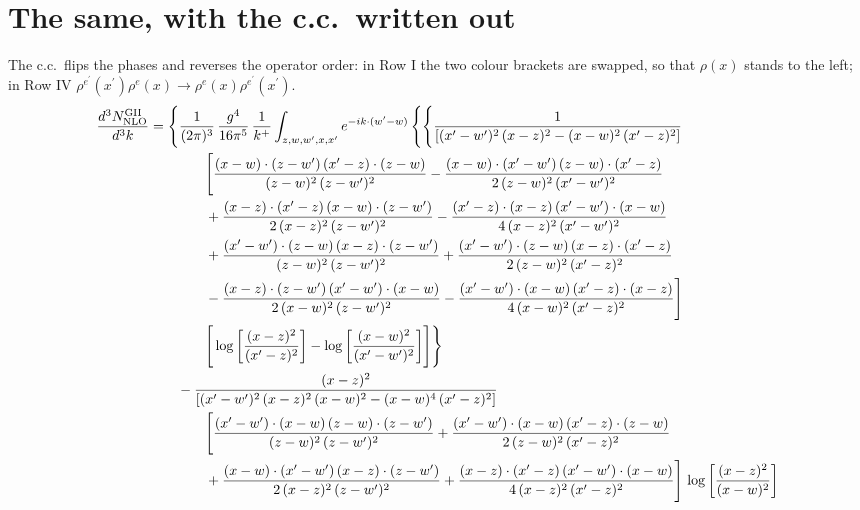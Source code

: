 \documentclass[10pt]{article}
\begin{document}
\section{The same, with the c.c.\ written out}
The c.c.\ flips the phases and reverses the operator order: in Row I the two colour brackets are swapped, so that $\rho(x)$ stands to the left; in Row IV $\rho^{e^{\prime}}(x^{\prime})\rho^{e}(x)\to\rho^{e}(x)\rho^{e^{\prime}}(x^{\prime})$.
\begin{align}
\frac{d^{3}N^{\rm GII}_{\rm NLO}}{d^{3}k}&=\Bigg\{\frac{1}{(2\pi)^{3}}\,\frac{g^{4}}{16\pi^{5}}\,\frac{1}{k^{+}}\int_{z,w,w^{\prime},x,x^{\prime}}e^{-ik\cdot(w^{\prime}-w)}\,\Bigg\{\Bigg\{ \frac{1}{\left[(x^{\prime}-w^{\prime})^{2}\, (x-z)^{2}-(x-w)^{2}\, (x^{\prime}-z)^{2}\right]}\,\notag\\&\qquad\qquad  \Bigg[\frac{(x-w)\cdot (z-w^{\prime})\, (x^{\prime}-z)\cdot (z-w)}{(z-w)^{2}\,(z-w^{\prime})^{2}}-\frac{(x-w)\cdot (x^{\prime}-w^{\prime})\, (z-w)\cdot (x^{\prime}-z)}{2\, (z-w)^{2}\, (x^{\prime}-w^{\prime})^{2}}\notag\\&\qquad\qquad  + \frac{(x-z)\cdot (x^{\prime}-z)\, (x-w)\cdot (z-w^{\prime})}{2\, (x-z)^{2}\, (z-w^{\prime})^{2}}-\frac{(x^{\prime}-z)\cdot (x-z)\, (x^{\prime}-w^{\prime})\cdot (x-w)}{4\, (x-z)^{2}\, (x^{\prime}-w^{\prime})^{2}}\notag\\&\qquad\qquad  + \frac{(x^{\prime}-w^{\prime})\cdot (z-w)\, (x-z)\cdot (z-w^{\prime})}{(z-w)^{2}\,(z-w^{\prime})^{2}}+\frac{(x^{\prime}-w^{\prime})\cdot (z-w)\, (x-z)\cdot (x^{\prime}-z)}{2\, (z-w)^{2}\, (x^{\prime}-z)^{2}}\notag\\&\qquad\qquad  - \frac{(x-z)\cdot (z-w^{\prime})\, (x^{\prime}-w^{\prime})\cdot (x-w)}{2\, (x-w)^{2}\, (z-w^{\prime})^{2}} -\frac{(x^{\prime}-w^{\prime})\cdot (x-w)\, (x^{\prime}-z)\cdot (x-z)}{4\, (x-w)^{2}\, (x^{\prime}-z)^{2}}\Bigg]\notag\\&\qquad\qquad   \Bigg[\log{\left[\frac{(x-z)^{2}}{ (x^{\prime}-z)^{2}}\right]}-\log{\left[\frac{(x-w)^{2}}{(x^{\prime}-w^{\prime})^{2}}\right]}\Bigg]\Bigg\}\notag\\
&\qquad-\frac{(x-z)^{2}}{\left[(x^{\prime}-w^{\prime})^{2}\,(x-z)^{2}\,(x-w)^{2} - (x-w)^{4}\, (x^{\prime}-z)^{2}\right]}\,  \notag\\&\qquad\qquad  \Bigg[\frac{(x^{\prime}-w^{\prime})\cdot (x-w)\, (z-w)\cdot (z-w^{\prime})}{(z-w)^{2}\, (z-w^{\prime})^{2}}+\frac{(x^{\prime}-w^{\prime})\cdot (x-w)\, (x^{\prime}-z)\cdot (z-w)}{2\, (z-w)^{2}\, (x^{\prime}-z)^{2}}\notag\\&\qquad\qquad  +\frac{(x-w)\cdot (x^{\prime}-w^{\prime})\, (x-z)\cdot (z-w^{\prime})}{2\, (x-z)^{2}\, (z-w^{\prime})^{2}}+\frac{(x-z)\cdot (x^{\prime}-z)\, (x^{\prime}-w^{\prime})\cdot (x-w)}{4\, (x-z)^{2}\, (x^{\prime}-z)^{2}}\Bigg] \,\log{\left[\frac{(x-z)^{2}}{(x-w)^{2}}\right]}\notag\\

\end{align}
\end{document}
